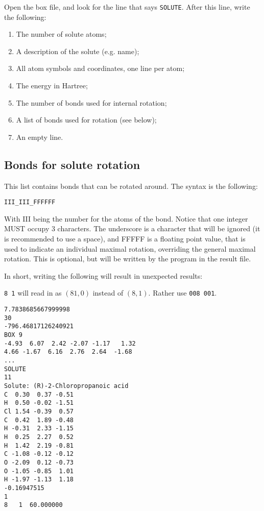 Open the box file, and look for the line that says \verb|SOLUTE|. After this 
line, write the following:

\begin{enumerate}
	\item The number of solute atoms;
	\item A description of the solute (e.g. name);
	\item All atom symbols and coordinates, one line per atom;
	\item The energy in Hartree;
	\item The number of bonds used for internal rotation;
	\item A list of bonds used for rotation (see below);
	\item An empty line.
\end{enumerate}

\subsection{Bonds for solute rotation}
This list contains bonds that can be rotated around. The syntax is the 
following:

\verb|III_III_FFFFFF|

With III being the number for the atoms of the bond. Notice that one integer 
MUST occupy 3 characters. The underscore is a character that will be ignored 
(it is recommended to use a space), 
and FFFFF is a floating point value, that is used to indicate an individual 
maximal rotation, overriding the general maximal rotation. This is optional, 
but will be written by the program in the result file.

In short, writing the following will result in unexpected results:

\verb|8 1| will read in as $(81, 0)$ instead of $(8, 1)$. Rather use 
\verb|008 001|.

\begin{lstlisting}[caption=Example of a correct box-file]
7.7838685667999998     
30
-796.46817126240921     
BOX 9
-4.93  6.07  2.42 -2.07 -1.17   1.32     
4.66 -1.67  6.16  2.76  2.64  -1.68     
...     
SOLUTE
11
Solute: (R)-2-Chloropropanoic acid
C  0.30  0.37 -0.51
H  0.50 -0.02 -1.51
Cl 1.54 -0.39  0.57
C  0.42  1.89 -0.48
H -0.31  2.33 -1.15
H  0.25  2.27  0.52
H  1.42  2.19 -0.81
C -1.08 -0.12 -0.12
O -2.09  0.12 -0.73
O -1.05 -0.85  1.01
H -1.97 -1.13  1.18
-0.16947515     
1
8   1  60.000000

\end{lstlisting}


